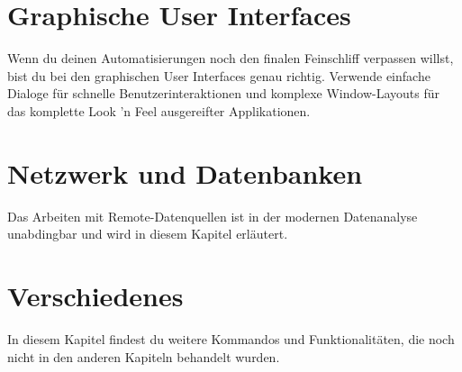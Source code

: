 \documentclass[DIV=17, parskip=half]{scrreprt}
\begin{document}
	\chapter{Graphische User Interfaces}
		Wenn du deinen Automatisierungen noch den finalen Feinschliff verpassen willst, bist du bei den graphischen User Interfaces genau richtig. Verwende einfache Dialoge f\"ur schnelle Benutzerinteraktionen und komplexe Window-Layouts f\"ur das komplette Look 'n Feel ausgereifter Applikationen.
		
		
	
	\chapter{Netzwerk und Datenbanken}
		Das Arbeiten mit Remote-Datenquellen ist in der modernen Datenanalyse unabdingbar und wird in diesem Kapitel erl\"autert.
		
		
		
		
	\chapter{Verschiedenes}
		In diesem Kapitel findest du weitere Kommandos und Funktionalit\"aten, die noch nicht in den anderen Kapiteln behandelt wurden.
		
		
		
		
		
\end{document}
